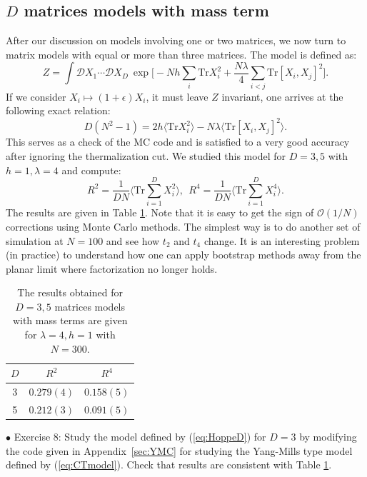 \documentclass[letter,11pt]{article}
\begin{document}
\subsection{\label{subsec:ext_Hoppe}$D$ matrices models with mass term}
After our discussion on models involving one or two matrices, we now turn to matrix models 
with equal or more than three matrices. The model is defined as:
\begin{equation}
\label{eq:HoppeD} 
	Z = \int \mathcal{D}X_1 \cdots \mathcal{D}X_D ~
	\exp\Big[ -Nh\sum_{i}\mbox{Tr}X_{i}^{2} + \frac{N\lambda}{4} \sum_{i < j} \mbox{Tr} [X_i,X_j]^{2}\Big]. 
\end{equation}
If we consider $X_i \mapsto (1+\epsilon) X_i$, it must leave $Z$ invariant, one arrives at the following exact relation: 
\begin{equation}
	D(N^2 -1) = 2 h \langle \mbox{Tr}X_{i}^{2} \rangle 
	- N \lambda \langle \mbox{Tr}[X_i,X_j]^{2} \rangle. 
\end{equation}
This serves as a check of the MC code and is satisfied to a very good accuracy
after ignoring the thermalization cut. We studied this model for $D=3,5$ with 
$h=1, \lambda=4$ and compute: 
\begin{equation}
\label{eq:R2R4} 
	R^2  =   \frac{1}{DN} \Bigg \langle \mbox{Tr} \sum_{i=1}^{D} X_{i}^2 \bigg \rangle, 
	~~ R^4  =   \frac{1}{DN} \Bigg \langle \mbox{Tr} \sum_{i=1}^{D} X_{i}^4 \bigg \rangle.  
\end{equation}
The results are given in Table \ref{table:D_YMM_data}. Note that it is easy to get the sign of $\mathcal{O}(1/N)$ corrections using Monte Carlo methods. The simplest way is to do another set of simulation at $N = 100$ and see how $t_{2}$ and 
$t_{4}$ change. It is an interesting problem (in practice) 
to understand how one can apply bootstrap methods away from the planar limit where factorization no longer holds.

\begin{table}[h!]
	\centering
	\begin{tabular}{||c c c||} 
		\hline
		$D$ & $ R^2$ & $R^4$ \\ [0.5ex] 
		\hline\hline
		3 & $ 0.279(4) $ & $ 0.158(5) $  \\ 
		5 & $ 0.212(3) $ & $ 0.091(5) $
		 \\ [1ex] 
		\hline 
	\end{tabular}
\caption{The results obtained for $D = 3,5$ matrices models with mass terms are given for $\lambda=4, h=1$ with $N=300$.}
\label{table:D_YMM_data}
\end{table}
\begin{mdframed}[backgroundcolor=blue!3] 
	\textsc{} 
	$\bullet$ Exercise 8: Study the model defined by (\ref{eq:HoppeD}) for $D=3$ by modifying the code given in Appendix~\ref{sec:YMC} for studying the Yang-Mills type model defined by (\ref{eq:CTmodel}). Check that results are consistent with Table \ref{table:D_YMM_data}.  
\end{mdframed}
\end{document}
